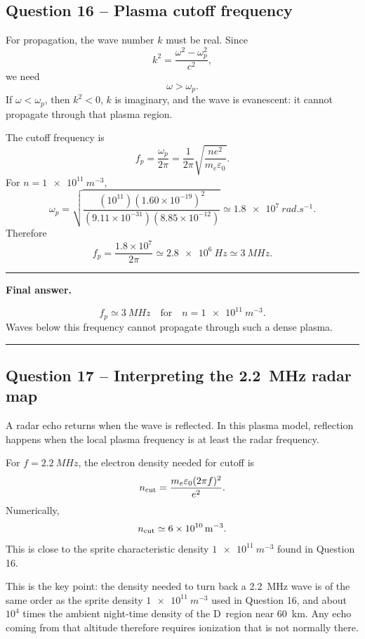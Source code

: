 \documentclass[11pt,a4paper]{article}
\newenvironment{finalanswer}{%
  \begin{center}\begin{minipage}{0.94\linewidth}\hrule\vspace{0.45em}\textbf{Final answer. }%
}{%
  \vspace{0.45em}\hrule\end{minipage}\end{center}%
}
\begin{document}
\subsection*{Question 16 -- Plasma cutoff frequency}

For propagation, the wave number $k$ must be real. Since
\[
 k^2=\frac{\omega^2-\omega_p^2}{c^2},
\]
we need
\[
 \omega>\omega_p.
\]
If $\omega<\omega_p$, then $k^2<0$, $k$ is imaginary, and the wave is evanescent: it cannot propagate through that plasma region.

The cutoff frequency is
\[
 f_p=\frac{\omega_p}{2\pi}
 =\frac{1}{2\pi}\sqrt{\frac{n e^2}{m_e\varepsilon_0}}.
\]
For $n=\SI{1e11}{m^{-3}}$,
\[
 \omega_p=\sqrt{\frac{(10^{11})(1.60\times10^{-19})^2}{(9.11\times10^{-31})(8.85\times10^{-12})}}
 \simeq\SI{1.8e7}{rad.s^{-1}}.
\]
Therefore
\[
 f_p=\frac{1.8\times10^7}{2\pi}\simeq\SI{2.8e6}{Hz}\simeq\SI{3}{MHz}.
\]

\begin{finalanswer}
\[
f_p\simeq\SI{3}{MHz}\quad\text{for}\quad n=\SI{1e11}{m^{-3}}.
\]
Waves below this frequency cannot propagate through such a dense plasma.
\end{finalanswer}

\subsection*{Question 17 -- Interpreting the \SI{2.2}{MHz} radar map}

A radar echo returns when the wave is reflected. In this plasma model, reflection happens when the local plasma frequency is at least the radar frequency.

For $f=\SI{2.2}{MHz}$, the electron density needed for cutoff is
\[
 n_{\rm cut}=\frac{m_e\varepsilon_0(2\pi f)^2}{e^2}.
\]
Numerically,
\[
 n_{\rm cut}\simeq\SI{6e10}{m^{-3}}.
\]
This is close to the sprite characteristic density $\SI{1e11}{m^{-3}}$ found in Question 16.

This is the key point: the density needed to turn back a \SI{2.2}{MHz} wave is
of the same order as the sprite density $\SI{1e11}{m^{-3}}$ used in Question 16,
and about $10^{4}$ times the ambient night-time density of the D~region near
\SI{60}{km}. Any echo coming from that altitude therefore requires ionization
that is not normally there.
\end{document}
